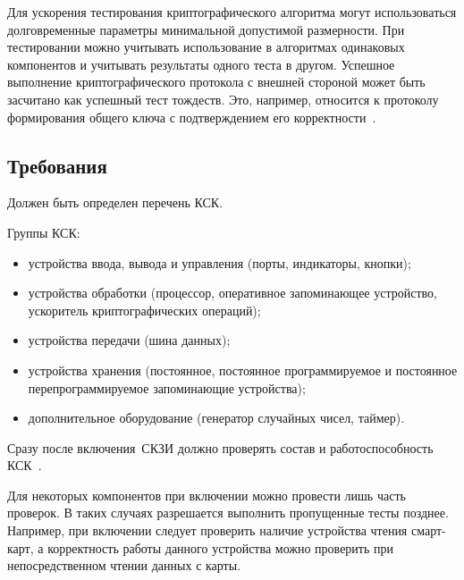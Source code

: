 Для ускорения тестирования криптографического алгоритма
могут использоваться долговременные параметры минимальной допустимой 
размерности. При тестировании можно учитывать 
использование в алгоритмах одинаковых компонентов и учитывать результаты
одного теста в другом. Успешное выполнение 
криптографического протокола с внешней стороной может быть засчитано
как успешный тест тождеств. Это, например, относится к протоколу 
формирования общего ключа с подтверждением его корректности~.


\subsection{Требования}\label{ST.Reqs}

\label{R.ST.CSCList} %
Должен быть определен перечень КСК.

Группы КСК:
\begin{itemize}
\item
устройства ввода, вывода и управления (порты, индикаторы, кнопки);
\item
устройства обработки (процессор, оперативное запоминающее устройство, 
ускоритель криптографических операций); 
\item
устройства передачи (шина данных);
\item
устройства хранения (постоянное, постоянное программируемое и постоянное 
перепрограммируемое запоминающие устройства); 
\item
дополнительное оборудование (генератор случайных чисел, таймер). 
\end{itemize}
\fi

\label{R.ST.CSCTests} %
Сразу после включения~СКЗИ должно проверять состав 
и работоспособность КСК~.

\begin{note}
Для некоторых компонентов при включении можно провести лишь часть 
проверок. В таких случаях разрешается выполнить пропущенные тесты позднее. 
Например, при включении следует проверить наличие устройства чтения 
смарт-карт, а корректность работы данного устройства можно проверить при 
непосредственном чтении данных с карты. 
\end{note}

